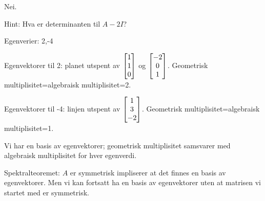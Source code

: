 \begin{losning}
\begin{punkt}
Nei.
\end{punkt}

\begin{punkt}
Hint: Hva er determinanten til $A-2I$?
\end{punkt}

\begin{punkt}
Egenverier: 2,-4

\noindent
Egenvektorer til  2: planet utspent av $\begin{bmatrix} 1 \\ 1 \\ 0 \end{bmatrix}$ og $\begin{bmatrix} -2 \\ 0 \\ 1 \end{bmatrix}$. Geometrisk multiplisitet=algebraisk multiplisitet=2.

\noindent
Egenvektorer til  -4: linjen utspent av $\begin{bmatrix} 1 \\ 3 \\ -2 \end{bmatrix}$. Geometrisk multiplisitet=algebraisk multiplisitet=1.

\noindent
Vi har en basis av egenvektorer; geometrisk multiplisitet samsvarer med algebraisk multiplisitet for hver egenverdi.


\end{punkt}


\begin{punkt}
Spektralteoremet: $A$ er symmetrisk impliserer at det finnes en basis av egenvektorer. Men vi kan fortsatt ha en basis av egenvektorer uten at matrisen vi startet med er symmetrisk.
\end{punkt}

\end{losning}